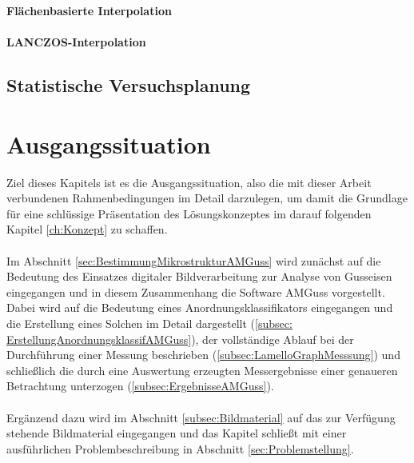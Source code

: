 \documentclass[
fontsize=10pt, 
listof = totoc,
parskip = half	
]{report}
\begin{document}
%		
%

\noindent\textbf{Flächenbasierte Interpolation}
\\\\
\noindent\textbf{LANCZOS-Interpolation}


\section{Statistische Versuchsplanung}
\label{sec:MethodenStatAnalyse}


\chapter{Ausgangssituation}
\label{ch:Ausgangssituation}
Ziel dieses Kapitels ist es die Ausgangssituation, also die mit dieser Arbeit verbundenen Rahmenbedingungen im Detail darzulegen, um damit die Grundlage für eine schlüssige Präsentation des Lösungskonzeptes im darauf folgenden Kapitel \ref{ch:Konzept} zu schaffen.
\\\\
Im Abschnitt \ref{sec:BestimmungMikrostrukturAMGuss} wird zunächst auf die Bedeutung des Einsatzes digitaler Bildverarbeitung zur Analyse von Gusseisen eingegangen und in diesem Zusammenhang die Software AMGuss vorgestellt. Dabei wird auf die Bedeutung eines Anordnungsklassifikators eingegangen und die Erstellung eines Solchen im Detail dargestellt (\ref{subsec: ErstellungAnordnungsklassifAMGuss}),  der vollständige Ablauf bei der Durchführung einer Messung beschrieben (\ref{subsec:LamelloGraphMesssung}) und schließlich die durch eine Auswertung erzeugten Messergebnisse einer genaueren Betrachtung unterzogen (\ref{subsec:ErgebnisseAMGuss}).
\\\\
Ergänzend dazu wird im Abschnitt \ref{subsec:Bildmaterial} auf das zur Verfügung stehende Bildmaterial eingegangen und das Kapitel schließt mit einer ausführlichen Problembeschreibung in Abschnitt \ref{sec:Problemstellung}.
\end{document}
